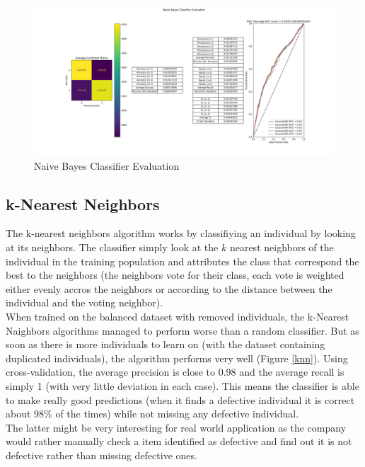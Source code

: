 \begin{figure}
    \center
    \includegraphics[scale=0.32]{img/nbc_d.png}
    \caption{Naive Bayes Classifier Evaluation}
    \label{nbc}
\end{figure}

\subsection{k-Nearest Neighbors}
The k-nearest neighbors algorithm works by classifiying an individual by looking at its neighbors\cite{knn_wikipedia}. The classifier simply look at the \(k\) nearest neighbors of the individual in the training population and attributes the class that correspond the best to the neighbors (the neighbors vote for their class, each vote is weighted either evenly accros the neighbors or according to the distance between the individual and the voting neighbor\cite{knn_scikit}).\\

When trained on the balanced dataset with removed individuals, the k-Nearest Naighbors algorithms managed to perform worse than a random classifier. But as soon as there is more individuals to learn on (with the dataset containing duplicated individuals), the algorithm performs very well (Figure \ref{knn}). Using cross-validation, the average precision is close to 0.98 and the average recall is simply 1 (with very little deviation in each case). This means the classifier is able to make really good predictions (when it finds a defective individual it is correct about 98\% of the times) while not missing any defective individual.\\
The latter might be very interesting for real world application as the company would rather manually check a item identified as defective and find out it is not defective rather than missing defective ones.

